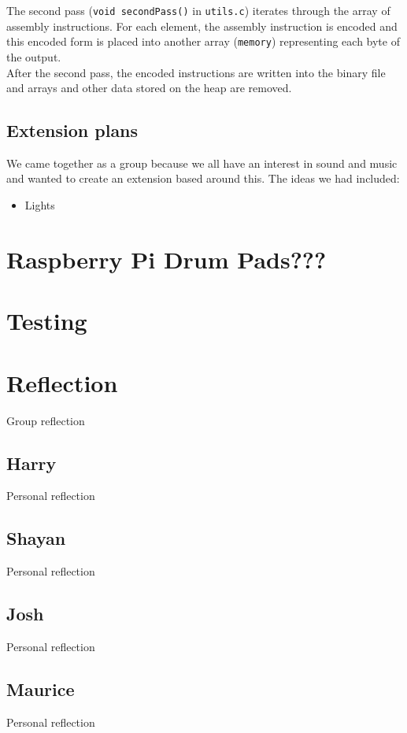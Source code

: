 \documentclass[11pt]{article}
\begin{document}
The second pass (\texttt{void secondPass()} in \texttt{utils.c}) iterates through the array of assembly instructions. For each element, the assembly instruction is encoded and this encoded form is placed into another array (\texttt{memory}) representing each byte of the output.\\

After the second pass, the encoded instructions are written into the binary file and arrays and other data stored on the heap are removed.

\subsection{Extension plans}

We came together as a group because we all have an interest in sound and music and wanted to create an extension based around this. The ideas we had included:
\begin{itemize}
\item Lights
\end{itemize}

\section{Raspberry Pi Drum Pads???}

\section{Testing}

\section{Reflection}
Group reflection

\subsection{Harry}
Personal reflection

\subsection{Shayan}
Personal reflection

\subsection{Josh}
Personal reflection

\subsection{Maurice}
Personal reflection
\end{document}
